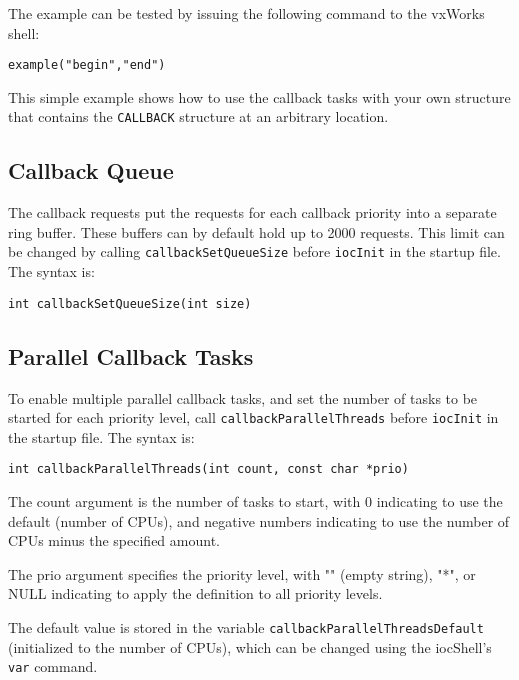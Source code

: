 The example can be tested by issuing the following command to the vxWorks shell:

\begin{verbatim}
example("begin","end")
\end{verbatim}

This simple example shows how to use the callback tasks with your own structure that contains the \verb|CALLBACK| structure 
at an arbitrary location.

\subsection{Callback Queue}

The callback requests put the requests for each callback priority into a separate ring buffer. These buffers can by default 
hold up to 2000 requests. This limit can be changed by calling \verb|callbackSetQueueSize| before \verb|iocInit| in the 
startup file. The syntax is:

\begin{verbatim}
int callbackSetQueueSize(int size)
\end{verbatim}

\subsection{Parallel Callback Tasks}
\label{Parallel Callback Tasks}

To enable multiple parallel callback tasks, and set the number of tasks to be started for each priority level, call
\verb|callbackParallelThreads| before \verb|iocInit| in the startup file. The syntax is:

\begin{verbatim}
int callbackParallelThreads(int count, const char *prio)
\end{verbatim}

The count argument is the number of tasks to start, with 0 indicating to use the default (number of CPUs), and negative numbers indicating to use the number of CPUs minus the specified amount.

The prio argument specifies the priority level, with "" (empty string), "*", or NULL indicating to apply the definition to all priority levels.

The default value is stored in the variable \verb|callbackParallelThreadsDefault| (initialized to the number of CPUs), which can be changed using the iocShell's \verb|var| command.

